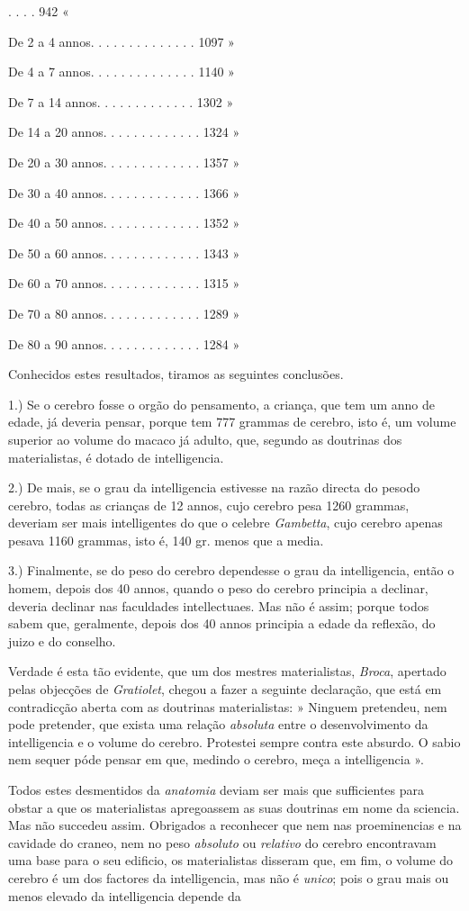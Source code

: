 . . . . 942 «\par De 2 a 4 annos. . . . . . . . . . . . . . 1097 »\par De 4 a 7 annos. . . . . . . . . . . . . . 1140 »\par De 7 a 14 annos. . . . . . . . . . . . . 1302 »\par De 14 a 20 annos. . . . . . . . . . . . . 1324 »\par De 20 a 30 annos. . . . . . . . . . . . . 1357 »\par De 30 a 40 annos. . . . . . . . . . . . . 1366 »\par De 40 a 50 annos. . . . . . . . . . . . . 1352 »\par De 50 a 60 annos. . . . . . . . . . . . . 1343 »\par De 60 a 70 annos. . . . . . . . . . . . . 1315 »\par De 70 a 80 annos. . . . . . . . . . . . . 1289 »\par De 80 a 90 annos. . . . . . . . . . . . . 1284 »\par Conhecidos estes resultados, tiramos as seguintes conclusões.\par 1.) Se o cerebro fosse o orgão do pensamento, a criança, que tem um anno de edade, já deveria pensar, porque tem 777 grammas de cerebro, isto é, um volume superior ao volume do macaco já adulto, que, segundo as doutrinas dos materialistas, é dotado de intelligencia.\par 2.) De mais, se o grau da intelligencia estivesse na razão directa do pesodo cerebro, todas as crianças de 12 annos, cujo cerebro pesa 1260 grammas, deveriam ser mais intelligentes do que o celebre \emph{Gambetta}, cujo cerebro apenas pesava 1160 grammas, isto é, 140 gr. menos que a media.\par 3.) Finalmente, se do peso do cerebro dependesse o grau da intelligencia, então o homem, depois dos 40 annos, quando o peso do cerebro principia a declinar, deveria declinar nas faculdades intellectuaes. Mas não é assim; porque todos sabem que, geralmente, depois dos 40 annos principia a edade da reflexão, do juizo e do conselho.\par Verdade é esta tão evidente, que um dos mestres materialistas, \emph{Broca}, apertado pelas objecções de \emph{Gratiolet}, chegou a fazer a seguinte declaração, que está em contradicção aberta com as doutrinas materialistas: » Ninguem pretendeu, nem pode pretender, que exista uma relação \emph{absoluta} entre o desenvolvimento da intelligencia e o volume do cerebro. Protestei sempre contra este absurdo. O sabio nem sequer póde pensar em que, medindo o cerebro, meça a intelligencia ».\par Todos estes desmentidos da \emph{anatomia} deviam ser mais que sufficientes para obstar a que os materialistas apregoassem as suas doutrinas em nome da sciencia. Mas não succedeu assim. Obrigados a reconhecer que nem nas proeminencias e na cavidade do craneo, nem no peso \emph{absoluto} ou \emph{relativo} do cerebro encontravam uma base para o seu edificio, os materialistas disseram que, em fim, o volume do cerebro é um dos factores da intelligencia, mas não é \emph{unico}; pois o grau mais ou menos elevado da intelligencia depende da 